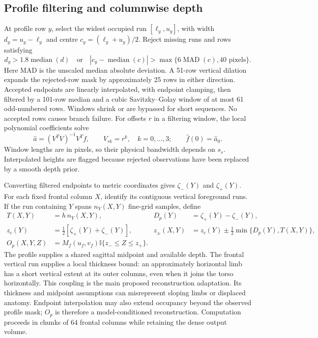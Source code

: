 \documentclass[11pt,a4paper]{article}
\newcommand{\indic}{\mathbb I}
\begin{document}
\subsection{Profile filtering and columnwise depth}
At profile row $y$, select the widest occupied run $[\ell_y,u_y]$, with width $d_y=u_y-\ell_y$ and centre $c_y=(\ell_y+u_y)/2$. Reject missing runs and rows satisfying
\begin{equation}
 d_y>1.8\operatorname{median}(d)\quad\text{or}\quad
 |c_y-\operatorname{median}(c)|>
 \max\{6\operatorname{MAD}(c),40\text{ pixels}\}.
\end{equation}
Here MAD is the unscaled median absolute deviation. A 51-row vertical dilation expands the rejected-row mask by approximately 25 rows in either direction. Accepted endpoints are linearly interpolated, with endpoint clamping, then filtered by a 101-row median and a cubic Savitzky--Golay window of at most 61 odd-numbered rows. Windows shrink or are bypassed for short sequences. No accepted rows causes branch failure. For offsets $r$ in a filtering window, the local polynomial coefficients solve
\begin{equation}
 \hat a=(V^TV)^{-1}V^Tf,\qquad V_{rk}=r^k,\quad k=0,\ldots,3;
 \qquad \hat f(0)=\hat a_0.
\end{equation}
Window lengths are in pixels, so their physical bandwidth depends on $s_s$. Interpolated heights are flagged because rejected observations have been replaced by a smooth depth prior.

Converting filtered endpoints to metric coordinates gives $\zeta_-(Y)$ and $\zeta_+(Y)$. For each fixed frontal column $X$, identify its contiguous vertical foreground runs. If the run containing $Y$ spans $n_Y(X,Y)$ fine-grid samples, define
\begin{equation}
 \begin{aligned}
 T(X,Y)&=h\,n_Y(X,Y),&
 D_p(Y)&=\zeta_+(Y)-\zeta_-(Y),\\
 z_c(Y)&=\tfrac12[\zeta_+(Y)+\zeta_-(Y)],&
 z_\pm(X,Y)&=z_c(Y)\pm\tfrac12\min\{D_p(Y),T(X,Y)\},\\
 O_p(X,Y,Z)&=M_f(u_f,v_f)\indic\{z_-\leq Z\leq z_+\}.&&
 \end{aligned}
 \label{eq:profile}
\end{equation}
The profile supplies a shared sagittal midpoint and available depth. The frontal vertical run supplies a local thickness bound: an approximately horizontal limb has a short vertical extent at its outer columns, even when it joins the torso horizontally. This coupling is the main proposed reconstruction adaptation. Its thickness and midpoint assumptions can misrepresent sloping limbs or displaced anatomy. Endpoint interpolation may also extend occupancy beyond the observed profile mask; $O_p$ is therefore a model-conditioned reconstruction. Computation proceeds in chunks of 64 frontal columns while retaining the dense output volume.
\end{document}
